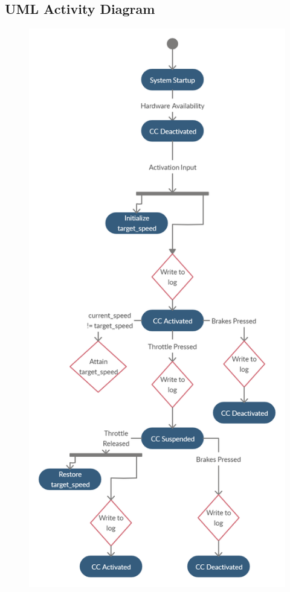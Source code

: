 \documentclass{article}
\begin{document}
	\subsection{UML Activity Diagram}
	\begin{figure}[!htb]
		\centering
		\includegraphics[scale=.26]{cs347_activity}
	\end{figure}
	
\end{document}
